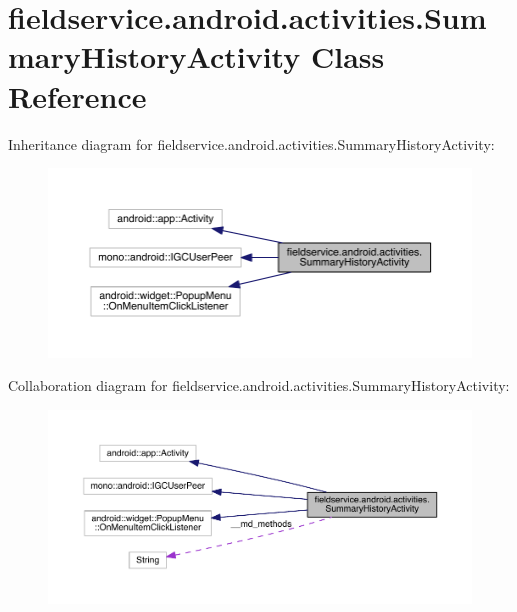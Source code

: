 \hypertarget{classfieldservice_1_1android_1_1activities_1_1_summary_history_activity}{\section{fieldservice.\+android.\+activities.\+Summary\+History\+Activity Class Reference}
\label{classfieldservice_1_1android_1_1activities_1_1_summary_history_activity}
}


Inheritance diagram for fieldservice.\+android.\+activities.\+Summary\+History\+Activity\+:
\nopagebreak
\begin{figure}[H]
\begin{center}
\leavevmode
\includegraphics[width=350pt]{classfieldservice_1_1android_1_1activities_1_1_summary_history_activity__inherit__graph}
\end{center}
\end{figure}


Collaboration diagram for fieldservice.\+android.\+activities.\+Summary\+History\+Activity\+:
\nopagebreak
\begin{figure}[H]
\begin{center}
\leavevmode
\includegraphics[width=350pt]{classfieldservice_1_1android_1_1activities_1_1_summary_history_activity__coll__graph}
\end{center}
\end{figure}
